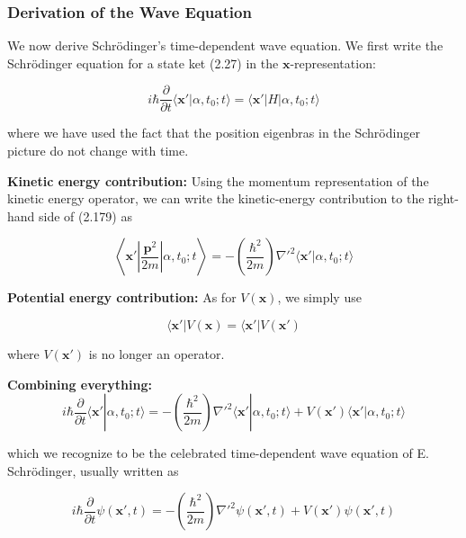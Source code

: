 \documentclass[11pt,a4paper]{article}
\begin{document}
\subsubsection{Derivation of the Wave Equation}

We now derive Schrödinger's time-dependent wave equation. We first write the Schrödinger equation for a state ket (2.27) in the $\mathbf{x}$-representation:

\begin{equation}
i\hbar \frac{\partial}{\partial t}\langle \mathbf{x}'|\alpha, t_0; t\rangle = \langle \mathbf{x}'|H|\alpha, t_0; t\rangle
\tag{2.179}
\end{equation}

where we have used the fact that the position eigenbras in the Schrödinger picture do not change with time.

\textbf{Kinetic energy contribution:}
Using the momentum representation of the kinetic energy operator, we can write the kinetic-energy contribution to the right-hand side of (2.179) as

\begin{equation}
\left\langle \mathbf{x}'\left|\frac{\mathbf{p}^2}{2m}\right|\alpha, t_0; t\right\rangle = -\left(\frac{\hbar^2}{2m}\right)\nabla'^2 \langle \mathbf{x}'|\alpha, t_0; t\rangle
\tag{2.180}
\end{equation}

\textbf{Potential energy contribution:}
As for $V(\mathbf{x})$, we simply use

\begin{equation}
\langle \mathbf{x}'|V(\mathbf{x}) = \langle \mathbf{x}'|V(\mathbf{x}')
\tag{2.181}
\end{equation}

where $V(\mathbf{x}')$ is no longer an operator.

\textbf{Combining everything:}
\begin{equation}
i\hbar \frac{\partial}{\partial t}\langle \mathbf{x}'|\alpha, t_0; t\rangle = -\left(\frac{\hbar^2}{2m}\right)\nabla'^2 \langle \mathbf{x}'|\alpha, t_0; t\rangle + V(\mathbf{x}')\langle \mathbf{x}'|\alpha, t_0; t\rangle
\tag{2.182}
\end{equation}

which we recognize to be the celebrated time-dependent wave equation of E. Schrödinger, usually written as

\begin{equation}
\boxed{i\hbar \frac{\partial}{\partial t}\psi(\mathbf{x}', t) = -\left(\frac{\hbar^2}{2m}\right)\nabla'^2 \psi(\mathbf{x}', t) + V(\mathbf{x}')\psi(\mathbf{x}', t)}
\tag{2.183}
\end{equation}
\end{document}
